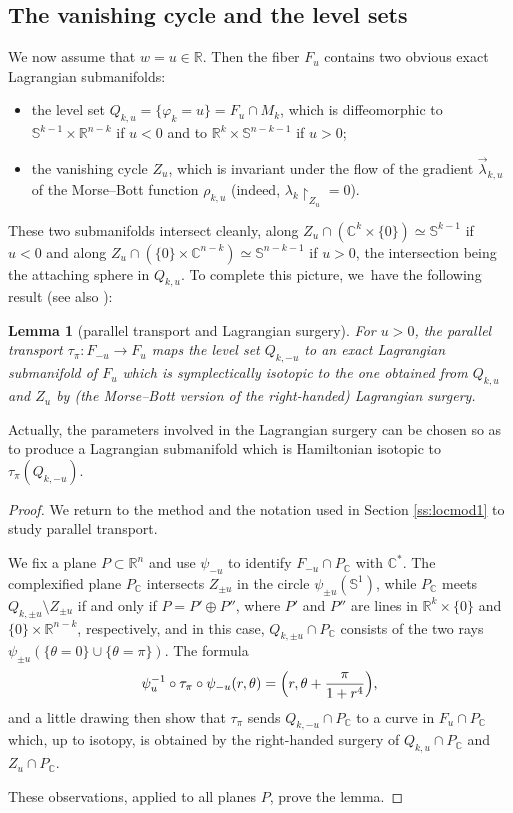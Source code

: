 \documentclass[JEP,XML,SOM,Unicode]{cedram}
\newcommand{\C}{{\mathbb C}}
\newcommand{\R}{{\mathbb R}}
\newcommand{\bS}{{\mathbb S}}
\newcommand{\tu}[1]{\textup{#1}}
\newcommand{\rst}[1]{{\upharpoonright}_{\!#1}}
\let\on\colon
\theoremstyle{plain}
\newtheorem{lemma}[theorem]{Lemma}
\theoremstyle{definition}
\begin{document}
\smallskip

\subsection{The vanishing cycle and the level sets} \label{ss:locmod3}

We now assume that $w=u \in \R$. Then the fiber $F_u$ contains two obvious exact
Lagrangian submanifolds:
\begin{itemize}
\item
the level set $Q_{k,u} = \{\varphi_k=u\} = F_u \cap M_k$, which is diffeomorphic
to $\bS^{k-1} \times \R^{n-k}$ if $u<0$ and to $\R^k \times \bS^{n-k-1}$ if $u>0$;
\item
the vanishing cycle $Z_u$, which is invariant under the flow of the gradient
$\vec\lambda_{k,u}$ of the Morse--Bott function $\rho_{k,u}$ (indeed, $\lambda_k
\rst{ Z_u } = 0$).
\end{itemize}
These two submanifolds intersect cleanly, along $Z_u \cap (\C^k \times \{0\})
\simeq \bS^{k-1}$ if $u<0$ and along $Z_u \cap (\{0\} \times \C^{n-k}) \simeq
\bS^{n-k-1}$ if $u>0$, the intersection being the attaching sphere in $Q_{k,u}$.
To complete this picture, we~have the following result (see also \cite[Th.\,1.8.4]{Sr}):

\begin{lemma}[parallel transport and Lagrangian surgery] \label{l:surgery}
For $u>0$, the parallel transport $\tau_\pi \on F_{-u} \to F_u$ maps the level
set $Q_{k,-u}$ to an exact Lagrangian submanifold of $F_u$ which is
symplectically isotopic to the one obtained from $Q_{k,u}$ and $Z_u$ by \tu(the
Morse--Bott version of the right-handed\tu) Lagrangian surgery.
\end{lemma}

Actually, the parameters involved in the Lagrangian surgery can be chosen so as
to produce a Lagrangian submanifold which is Hamiltonian isotopic to $\tau_\pi
(Q_{k,-u})$.

\begin{proof}
We return to the method and the notation used in Section \ref{ss:locmod1} to
study parallel transport.

We fix a plane $P \subset \R^n$ and use $\psi_{-u}$ to identify $F_{-u} \cap
P_\C$ with $\C^*$. The complexified plane $P_\C$ intersects $Z_{\pm u}$ in the
circle $\psi_{\pm u}(\bS^1)$, while $P_\C$ meets $Q_{k,\pm u} \setminus Z_{\pm u}$ if and
only if $P = P' \oplus P''$, where $P'$ and $P''$ are lines in $\R^k \times
\{0\}$ and $\{0\} \times \R^{n-k}$, respectively, and in this case, $Q_{k,\pm u}
\cap P_\C$ consists of the two rays $\psi_{\pm u} (\{\theta = 0\} \cup \{\theta
= \pi\})$. The formula
\[
\psi_u^{-1} \circ \tau_\pi \circ \psi_{-u} (r,\theta)
 = \Bigl(r, \theta + \frac{\pi}{1+r^4}\Bigr),
\]
and a little drawing then show that $\tau_\pi$ sends $Q_{k,-u} \cap P_\C$ to a
curve in $F_u \cap P_\C$ which, up to isotopy, is obtained by the right-handed
surgery of $Q_{k,u} \cap P_\C$ and $Z_u \cap P_\C$.

These observations, applied to all planes $P$, prove the lemma.
\end{proof}
\end{document}
